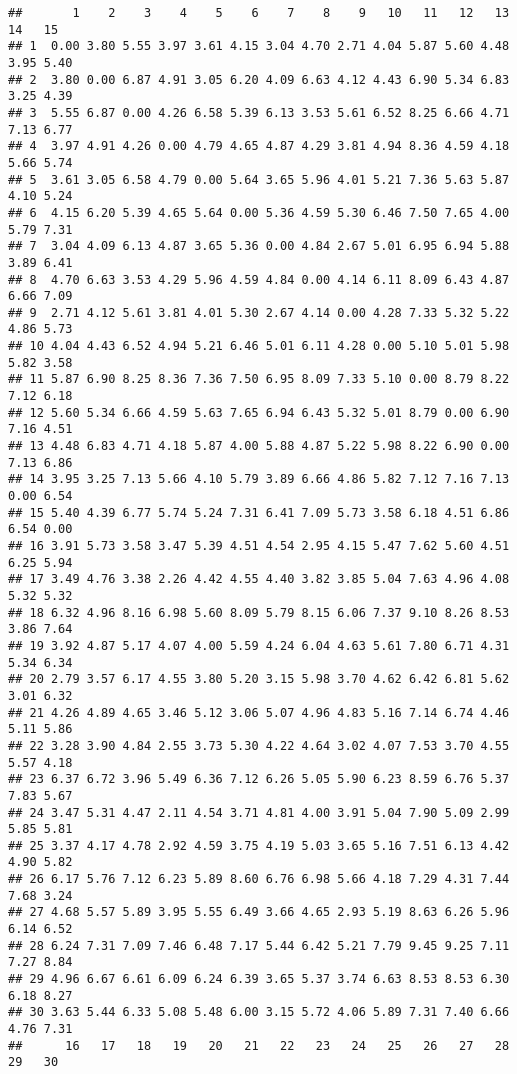 \documentclass[
]{article}
\begin{document}
\begin{verbatim}
##       1    2    3    4    5    6    7    8    9   10   11   12   13   14   15
## 1  0.00 3.80 5.55 3.97 3.61 4.15 3.04 4.70 2.71 4.04 5.87 5.60 4.48 3.95 5.40
## 2  3.80 0.00 6.87 4.91 3.05 6.20 4.09 6.63 4.12 4.43 6.90 5.34 6.83 3.25 4.39
## 3  5.55 6.87 0.00 4.26 6.58 5.39 6.13 3.53 5.61 6.52 8.25 6.66 4.71 7.13 6.77
## 4  3.97 4.91 4.26 0.00 4.79 4.65 4.87 4.29 3.81 4.94 8.36 4.59 4.18 5.66 5.74
## 5  3.61 3.05 6.58 4.79 0.00 5.64 3.65 5.96 4.01 5.21 7.36 5.63 5.87 4.10 5.24
## 6  4.15 6.20 5.39 4.65 5.64 0.00 5.36 4.59 5.30 6.46 7.50 7.65 4.00 5.79 7.31
## 7  3.04 4.09 6.13 4.87 3.65 5.36 0.00 4.84 2.67 5.01 6.95 6.94 5.88 3.89 6.41
## 8  4.70 6.63 3.53 4.29 5.96 4.59 4.84 0.00 4.14 6.11 8.09 6.43 4.87 6.66 7.09
## 9  2.71 4.12 5.61 3.81 4.01 5.30 2.67 4.14 0.00 4.28 7.33 5.32 5.22 4.86 5.73
## 10 4.04 4.43 6.52 4.94 5.21 6.46 5.01 6.11 4.28 0.00 5.10 5.01 5.98 5.82 3.58
## 11 5.87 6.90 8.25 8.36 7.36 7.50 6.95 8.09 7.33 5.10 0.00 8.79 8.22 7.12 6.18
## 12 5.60 5.34 6.66 4.59 5.63 7.65 6.94 6.43 5.32 5.01 8.79 0.00 6.90 7.16 4.51
## 13 4.48 6.83 4.71 4.18 5.87 4.00 5.88 4.87 5.22 5.98 8.22 6.90 0.00 7.13 6.86
## 14 3.95 3.25 7.13 5.66 4.10 5.79 3.89 6.66 4.86 5.82 7.12 7.16 7.13 0.00 6.54
## 15 5.40 4.39 6.77 5.74 5.24 7.31 6.41 7.09 5.73 3.58 6.18 4.51 6.86 6.54 0.00
## 16 3.91 5.73 3.58 3.47 5.39 4.51 4.54 2.95 4.15 5.47 7.62 5.60 4.51 6.25 5.94
## 17 3.49 4.76 3.38 2.26 4.42 4.55 4.40 3.82 3.85 5.04 7.63 4.96 4.08 5.32 5.32
## 18 6.32 4.96 8.16 6.98 5.60 8.09 5.79 8.15 6.06 7.37 9.10 8.26 8.53 3.86 7.64
## 19 3.92 4.87 5.17 4.07 4.00 5.59 4.24 6.04 4.63 5.61 7.80 6.71 4.31 5.34 6.34
## 20 2.79 3.57 6.17 4.55 3.80 5.20 3.15 5.98 3.70 4.62 6.42 6.81 5.62 3.01 6.32
## 21 4.26 4.89 4.65 3.46 5.12 3.06 5.07 4.96 4.83 5.16 7.14 6.74 4.46 5.11 5.86
## 22 3.28 3.90 4.84 2.55 3.73 5.30 4.22 4.64 3.02 4.07 7.53 3.70 4.55 5.57 4.18
## 23 6.37 6.72 3.96 5.49 6.36 7.12 6.26 5.05 5.90 6.23 8.59 6.76 5.37 7.83 5.67
## 24 3.47 5.31 4.47 2.11 4.54 3.71 4.81 4.00 3.91 5.04 7.90 5.09 2.99 5.85 5.81
## 25 3.37 4.17 4.78 2.92 4.59 3.75 4.19 5.03 3.65 5.16 7.51 6.13 4.42 4.90 5.82
## 26 6.17 5.76 7.12 6.23 5.89 8.60 6.76 6.98 5.66 4.18 7.29 4.31 7.44 7.68 3.24
## 27 4.68 5.57 5.89 3.95 5.55 6.49 3.66 4.65 2.93 5.19 8.63 6.26 5.96 6.14 6.52
## 28 6.24 7.31 7.09 7.46 6.48 7.17 5.44 6.42 5.21 7.79 9.45 9.25 7.11 7.27 8.84
## 29 4.96 6.67 6.61 6.09 6.24 6.39 3.65 5.37 3.74 6.63 8.53 8.53 6.30 6.18 8.27
## 30 3.63 5.44 6.33 5.08 5.48 6.00 3.15 5.72 4.06 5.89 7.31 7.40 6.66 4.76 7.31
##      16   17   18   19   20   21   22   23   24   25   26   27   28   29   30

\end{verbatim}
\end{document}
